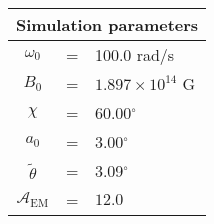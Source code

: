 \begin{tabular}{ccl}
\multicolumn{3}{c}{Simulation parameters} \\
\hline
$\omega_0$  &=& 100.0 rad/s\\
$B_0$  &=& $ 1.897\times 10^{14} $ G \\
$\chi$  &=& 60.00$^{\circ}$ \\
$a_0$ &=& 3.00$^{\circ}$ \\
$\tilde{\theta}$ &= & 3.09$^{\circ}$ \\
$\mathcal{A}_{\mathrm{EM}}$ &= & $12.0$
\end{tabular}
    